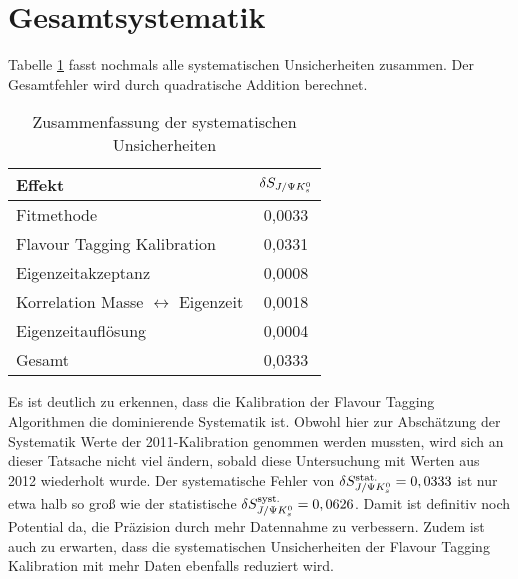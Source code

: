 \section{Gesamtsystematik}
Tabelle \ref{tab:syst_gesamt} fasst nochmals alle systematischen Unsicherheiten zusammen. Der Gesamtfehler wird durch quadratische Addition berechnet.
\begin{table}[hptb]
\centering
\caption{Zusammenfassung der systematischen Unsicherheiten}
\label{tab:syst_gesamt}
\begin{tabular}{l c }
\hline \hline
Effekt & $\delta S_{J/\Psi K_s^0}$ \\ \hline
Fitmethode & 0,0033 \\
Flavour Tagging Kalibration & 0,0331 \\
Eigenzeitakzeptanz & 0,0008 \\
Korrelation Masse $\leftrightarrow$ Eigenzeit & 0,0018 \\ 
Eigenzeitauflösung & 0,0004 \\ \hline 
Gesamt & 0,0333 \\ \hline \hline
\end{tabular}
\end{table}

Es ist deutlich zu erkennen, dass die Kalibration der Flavour Tagging Algorithmen die dominierende Systematik ist. Obwohl hier zur Abschätzung der Systematik Werte der 2011-Kalibration genommen werden mussten, wird sich an dieser Tatsache nicht viel ändern, sobald diese Untersuchung mit Werten aus 2012 wiederholt wurde. Der systematische Fehler von $\delta S_{J/\Psi K_s^0}^{\text{stat.}}=0,0333$ ist nur etwa halb so groß wie der statistische $\delta S_{J/\Psi K_s^0}^{\text{syst.}}=0,0626$. Damit ist definitiv noch Potential da, die Präzision durch mehr Datennahme zu verbessern. Zudem ist auch zu erwarten, dass die systematischen Unsicherheiten der Flavour Tagging Kalibration mit mehr Daten ebenfalls reduziert wird.